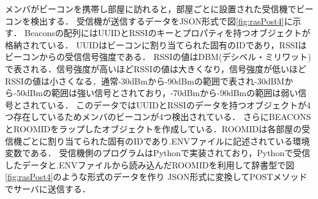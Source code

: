 

メンバがビーコンを携帯し部屋に訪れると，部屋ごとに設置された受信機でビーコンを検出する．
受信機が送信するデータをJSON形式で図\ref{fig:rasPost4}に示す．
Beaconsの配列にはUUIDとRSSIのキーとプロパティを持つオブジェクトが格納されている．
UUIDはビーコンに割り当てられた固有のIDであり，RSSIはビーコンからの受信信号強度である．
RSSIの値はDBM(デシベル・ミリワット)で表される．信号強度が高いほどRSSIの値は大きくなり，信号強度が低いほどRSSIの値は小さくなる．通常-30dBmから-90dBmの範囲で表され-30dBMから-50dBmの範囲は強い信号とされており，-70dBmから-90dBmの範囲は弱い信号とされている．
このデータではUUIDとRSSIのデータを持つオブジェクトが4つ存在しているためメンバのビーコンが4つ検出されている．
さらにBEACONSとROOMIDをラップしたオブジェクトを作成している．ROOMIDは各部屋の受信機ごとに割り当てられた固有のIDであり.ENVファイルに記述されている環境変数である．
受信機側のプログラムはPythonで実装されており，Pythonで受信したデータと.ENVファイルから読み込んだROOMIDを利用して辞書型で図\ref{fig:rasPost4}のような形式のデータを作り
JSON形式に変換してPOSTメソッドでサーバに送信する．


